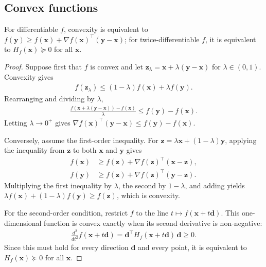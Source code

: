 \documentclass[a4paper, 12pt]{book}
\begin{document}
\subsection{Convex functions}

\begin{proposition}
    For differentiable $f$, convexity is equivalent to $f(\mathbf{y}) \geq f(\mathbf{x}) + \nabla f(\mathbf{x})^\top(\mathbf{y}-\mathbf{x})$; for twice-differentiable $f$, it is equivalent to $H_f(\mathbf{x}) \succeq 0$ for all $\mathbf{x}$.
\end{proposition}
\begin{proof}
    Suppose first that $f$ is convex and let
    $\mathbf{z}_\lambda=\mathbf{x}+\lambda(\mathbf{y}-\mathbf{x})$ for
    $\lambda\in(0,1)$. Convexity gives
    \begin{align}
        f(\mathbf{z}_\lambda)
        \leq (1-\lambda)f(\mathbf{x})+\lambda f(\mathbf{y}).
    \end{align}
    Rearranging and dividing by $\lambda$,
    \begin{align}
        \frac{f(\mathbf{x}+\lambda(\mathbf{y}-\mathbf{x}))-f(\mathbf{x})}{\lambda}
        \leq f(\mathbf{y})-f(\mathbf{x}).
    \end{align}
    Letting $\lambda\to0^+$ gives
    $\nabla f(\mathbf{x})^\top(\mathbf{y}-\mathbf{x})\leq f(\mathbf{y})-f(\mathbf{x})$.

    Conversely, assume the first-order inequality. For
    $\mathbf{z}=\lambda\mathbf{x}+(1-\lambda)\mathbf{y}$, applying the inequality
    from $\mathbf{z}$ to both $\mathbf{x}$ and $\mathbf{y}$ gives
    \begin{align}
        f(\mathbf{x}) &\geq f(\mathbf{z})+\nabla f(\mathbf{z})^\top(\mathbf{x}-\mathbf{z}),\\
        f(\mathbf{y}) &\geq f(\mathbf{z})+\nabla f(\mathbf{z})^\top(\mathbf{y}-\mathbf{z}).
    \end{align}
    Multiplying the first inequality by $\lambda$, the second by $1-\lambda$, and
    adding yields
    $\lambda f(\mathbf{x})+(1-\lambda)f(\mathbf{y})\geq f(\mathbf{z})$, which is
    convexity.

    For the second-order condition, restrict $f$ to the line
    $t\mapsto f(\mathbf{x}+t\mathbf{d})$. This one-dimensional function is convex
    exactly when its second derivative is non-negative:
    \begin{align}
        \frac{d^2}{dt^2}f(\mathbf{x}+t\mathbf{d})
        = \mathbf{d}^\top H_f(\mathbf{x}+t\mathbf{d})\,\mathbf{d}\geq0.
    \end{align}
    Since this must hold for every direction $\mathbf{d}$ and every point, it is
    equivalent to $H_f(\mathbf{x})\succeq0$ for all $\mathbf{x}$.
\end{proof}
\end{document}
